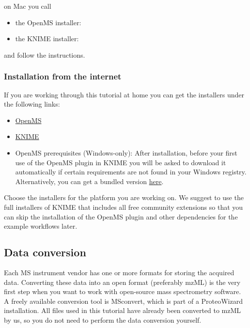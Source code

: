 on Mac you call
\begin{itemize}
  \item the OpenMS installer: \directory{\MacOpenMSInstallerName}
  \item the KNIME installer: \directory{\MacKnimeInstallerName}
\end{itemize}

and follow the instructions. 

\subsubsection{Installation from the internet}
If you are working through this tutorial at home you can get the installers under the following links:
\begin{itemize}
  \item \href{http://www.openms.de/downloads}{OpenMS}
  \item \href{https://www.knime.org/downloads/overview}{KNIME}
  \item OpenMS prerequisites (Windows-only): After installation, before your first use of the OpenMS plugin in KNIME you will be asked to download it automatically if certain requirements are not found in your Windows registry. Alternatively, you can get a bundled version \href{\WindowsPrerequisitesLink}{here}.
\end{itemize}
Choose the installers for the platform you are working on. We suggest to use the full installers of KNIME that includes all free community extensions so that you can skip the installation of the OpenMS plugin and other dependencies for the example workflows later.

\subsection{Data conversion}
\label{Data_Conversion}

Each MS instrument vendor has one or more formats for storing the acquired data. Converting these data into an open format (preferably mzML) is the very first step when you want to work with open-source mass spectrometry software. A freely available conversion tool is MSconvert, which is part of a ProteoWizard installation. All files used in this tutorial have already been converted to mzML by us, so you do not need to perform the data conversion yourself.


